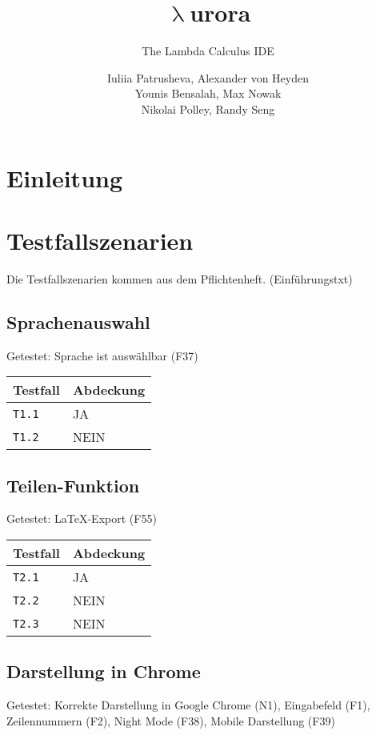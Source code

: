 \documentclass[parskip=full,11pt,twoside]{scrartcl}
\title{\textbf{$\uplambda$}urora}
\subtitle{The Lambda Calculus IDE}
\author{Iuliia Patrusheva, Alexander von Heyden\\
    Younis Bensalah, Max Nowak\\
    Nikolai Polley, Randy Seng}
\newcommand{\testline}[2]{
    \texttt{#1} & \ifthenelse{\equal{#2}{JA}}{\cellcolor{green!20}}{\cellcolor{red!20}}#2 \\ \hline
}
\begin{document}
\maketitle
\tableofcontents
\newpage

\section{Einleitung}


\section{Testfallszenarien}
    Die Testfallszenarien kommen aus dem Pflichtenheft. (Einführungstxt)

\subsection{Sprachenauswahl}
    Getestet:
    Sprache ist auswählbar (F37)

    \label{shortcuts}
    \begin{center}
        \begin{tabular}{ p{9cm} p{4cm}}
            Testfall & Abdeckung \\ \hline
            \testline{T1.1}{JA}
            \testline{T1.2}{NEIN}
        \end{tabular}
    \end{center}

\subsection{Teilen-Funktion}
    Getestet:
    LaTeX-Export (F55)

    \label{shortcuts}
    \begin{center}
        \begin{tabular}{ p{9cm} p{4cm}}
            Testfall & Abdeckung \\ \hline
            \testline{T2.1}{JA}
            \testline{T2.2}{NEIN}
            \testline{T2.3}{NEIN}
        \end{tabular}
    \end{center}

\subsection{Darstellung in Chrome}
    Getestet:
    Korrekte Darstellung in Google Chrome (N1),
    Eingabefeld (F1),
    Zeilennummern (F2),
    Night Mode (F38),
    Mobile Darstellung (F39)
\end{document}
